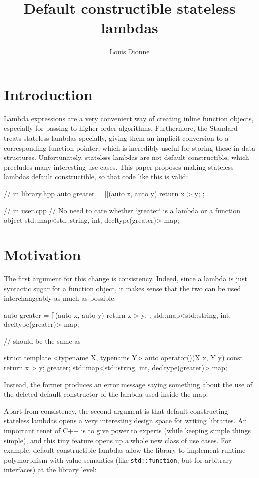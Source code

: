 \documentclass{wg21}
\title{Default constructible stateless lambdas}
\author{Louis Dionne}{ldionne.2@gmail.com}
\newcommand{\cc}[1]{\texttt{#1}}
\begin{document}
\maketitle

\section{Introduction}
Lambda expressions are a very convenient way of creating inline function objects,
especially for passing to higher order algorithms. Furthermore, the Standard
treats stateless lambdas specially, giving them an implicit conversion to a
corresponding function pointer, which is incredibly useful for storing these
in data structures. Unfortunately, stateless lambdas are not default constructible,
which precludes many interesting use cases. This paper proposes making stateless
lambdas default constructible, so that code like this is valid:

\begin{cpp}
// in library.hpp
auto greater = [](auto x, auto y) { return x > y; };

// in user.cpp
// No need to care whether `greater` is a lambda or a function object
std::map<std::string, int, decltype(greater)> map;
\end{cpp}


\section{Motivation}
The first argument for this change is consistency. Indeed, since a lambda is
just syntactic sugar for a function object, it makes sense that the two can be
used interchangeably as much as possible:

\begin{cpp}
auto greater = [](auto x, auto y) { return x > y; };
std::map<std::string, int, decltype(greater)> map;

// should be the same as

struct {
  template <typename X, typename Y>
  auto operator()(X x, Y y) const { return x > y; }
} greater;
std::map<std::string, int, decltype(greater)> map;
\end{cpp}

Instead, the former produces an error message saying something about the use
of the deleted default constructor of the lambda used inside the map.

Apart from consistency, the second argument is that default-constructing
stateless lambdas opens a very interesting design space for writing libraries.
An important tenet of C++ is to give power to experts (while keeping simple
things simple), and this tiny feature opens up a whole new class of use cases.
For example, default-constructible lambdas allow the \cite{Type Erased} library
to implement runtime polymorphism with value semantics (like \cc{std::function},
but for arbitrary interfaces) at the library level:
\end{document}
